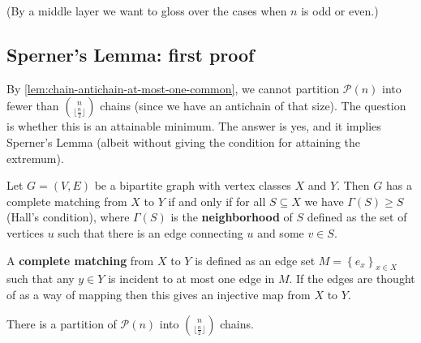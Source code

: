 (By a middle layer we want to gloss over the cases when $n$ is odd or even.)


\subsection{Sperner's Lemma: first proof}

By \cref{lem:chain-antichain-at-most-one-common}, we cannot partition $\mathcal{P}(n)$ into fewer than $\binom{n}{\lfloor \frac{n}{2} \rfloor}$ chains (since we have an antichain of that size). The question is whether this is an attainable minimum. The answer is yes, and it implies Sperner's Lemma (albeit without giving the condition for attaining the extremum).

\begin{lemma}
  Let $G = (V, E)$ be a bipartite graph with vertex classes $X$ and $Y$. Then $G$ has a complete matching from $X$ to $Y$ if and only if for all $S \subseteq  X$ we have $\Gamma(S) \ge S$ (Hall's condition), where $\Gamma(S)$ is the \textbf{neighborhood} of $S$ defined as the set of vertices $u$ such that there is an edge connecting $u$ and some $v \in S$.  
\end{lemma}

A \textbf{complete matching} from $X$ to $Y$ is defined as an edge set $M = \left\{ e_x \right\} _{x \in X}$ such that any $y \in Y$ is incident to at most one edge in $M$.  If the edges are thought of as a way of mapping then this gives an injective map from $X$ to $Y$. 


\begin{lemma}
  There is a partition of $\mathcal{P}(n)$ into  $\binom{n}{\lfloor \frac{n}{2} \rfloor}$ chains. 
\end{lemma}

